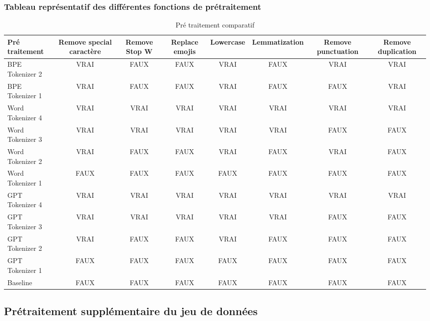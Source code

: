 \subsubsection*{Tableau représentatif des différentes fonctions de prétraitement}
\begin{table}[ht]
    \centering
    \begin{adjustbox}{max width=\textwidth}
    \renewcommand{\arraystretch}{1.5} %
    \setlength{\tabcolsep}{6pt} %
    \begin{tabular}{|p{3.5cm}|c|c|c|c|c|c|c|}
        \hline
        \textbf{Pré traitement} & \textbf{Remove special caractère} & \textbf{Remove Stop W} & \textbf{Replace emojis} & \textbf{Lowercase} & \textbf{Lemmatization} & \textbf{Remove punctuation} & \textbf{Remove duplication} \\
        \hline
        BPE Tokenizer 2  & VRAI & FAUX & FAUX & VRAI & FAUX & VRAI & VRAI \\
        BPE Tokenizer 1  & VRAI & FAUX & FAUX & VRAI & FAUX & FAUX & VRAI \\
        Word Tokenizer 4  & VRAI & VRAI & VRAI & VRAI & VRAI & VRAI & VRAI \\
        Word Tokenizer 3 & VRAI & VRAI & VRAI & VRAI & VRAI & FAUX & FAUX \\
        Word Tokenizer 2  & VRAI & FAUX & FAUX & VRAI & FAUX & VRAI & FAUX \\
        Word Tokenizer 1  & FAUX & FAUX & FAUX & FAUX & FAUX & FAUX & FAUX \\
        GPT Tokenizer 4  & VRAI & VRAI & VRAI & VRAI & VRAI & VRAI & VRAI \\
        GPT Tokenizer 3 & VRAI & VRAI & VRAI & VRAI & VRAI & FAUX & FAUX \\
        GPT Tokenizer 2  & VRAI & FAUX & FAUX & VRAI & FAUX & FAUX & FAUX \\
        GPT Tokenizer 1 & FAUX & FAUX & FAUX & FAUX & FAUX & FAUX & FAUX \\
        Baseline & FAUX & FAUX & FAUX & FAUX & FAUX & FAUX & FAUX \\
        \hline
    \end{tabular}
    \end{adjustbox}
    \caption{Pré traitement comparatif}
    \label{tab:pre_treatment_comparative}
\end{table}

\subsection{Prétraitement supplémentaire du jeu de données}

